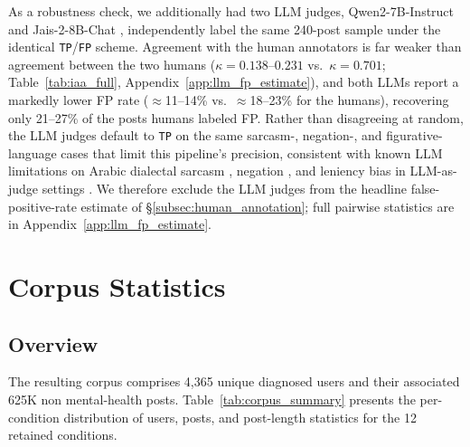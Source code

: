 \documentclass[letterpaper]{article} %
\begin{document}
As a robustness check, we additionally had two LLM judges, Qwen2-7B-Instruct \citep{yang-etal-2024-qwen2} and Jais-2-8B-Chat \citep{anwar-etal-2025-jais2}, independently label the same 240-post sample under the identical \texttt{TP}/\texttt{FP} scheme. Agreement with the human annotators is far weaker than agreement between the two humans ($\kappa{=}0.138$--$0.231$ vs.\ $\kappa{=}0.701$; Table~\ref{tab:iaa_full}, Appendix~\ref{app:llm_fp_estimate}), and both LLMs report a markedly lower FP rate ($\approx$11--14\% vs.\ $\approx$18--23\% for the humans), recovering only 21--27\% of the posts humans labeled FP. Rather than disagreeing at random, the LLM judges default to \texttt{TP} on the same sarcasm-, negation-, and figurative-language cases that limit this pipeline's precision, consistent with known LLM limitations on Arabic dialectal sarcasm \citep{abu-farha-magdy-2020-arabic}, negation \citep{garcia-ferrero-etal-2023-not}, and leniency bias in LLM-as-judge settings \citep{jain2025beyond}. We therefore exclude the LLM judges from the headline false-positive-rate estimate of \S\ref{subsec:human_annotation}; full pairwise statistics are in Appendix~\ref{app:llm_fp_estimate}.

\section{Corpus Statistics}
\label{sec:corpus}

\subsection{Overview}
\label{subsec:corpus_overview}
The resulting corpus comprises 4,365 unique diagnosed users and their associated 625K non mental-health posts. Table~\ref{tab:corpus_summary} presents the per-condition distribution of users, posts, and post-length statistics for the 12 retained conditions.
\end{document}
